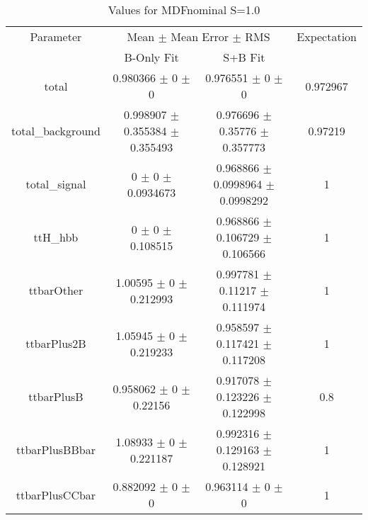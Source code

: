 \begin{table}
\centering
\caption{Values for MDFnominal S=1.0}
\begin{tabular}{cccc}
\toprule
Parameter & \multicolumn{2}{c}{Mean $\pm$ Mean Error $\pm$ RMS} & Expectation\\
 & B-Only Fit & S+B Fit & \\
\midrule
total & \num{0.980366} $\pm$ \num{0} $\pm$ \num{0} & \num{0.976551} $\pm$ \num{0} $\pm$ \num{0} & \num{0.972967}\\
total\_background & \num{0.998907} $\pm$ \num{0.355384} $\pm$ \num{0.355493} & \num{0.976696} $\pm$ \num{0.35776} $\pm$ \num{0.357773} & \num{0.97219}\\
total\_signal & \num{0} $\pm$ \num{0} $\pm$ \num{0.0934673} & \num{0.968866} $\pm$ \num{0.0998964} $\pm$ \num{0.0998292} & \num{1}\\
ttH\_hbb & \num{0} $\pm$ \num{0} $\pm$ \num{0.108515} & \num{0.968866} $\pm$ \num{0.106729} $\pm$ \num{0.106566} & \num{1}\\
ttbarOther & \num{1.00595} $\pm$ \num{0} $\pm$ \num{0.212993} & \num{0.997781} $\pm$ \num{0.11217} $\pm$ \num{0.111974} & \num{1}\\
ttbarPlus2B & \num{1.05945} $\pm$ \num{0} $\pm$ \num{0.219233} & \num{0.958597} $\pm$ \num{0.117421} $\pm$ \num{0.117208} & \num{1}\\
ttbarPlusB & \num{0.958062} $\pm$ \num{0} $\pm$ \num{0.22156} & \num{0.917078} $\pm$ \num{0.123226} $\pm$ \num{0.122998} & \num{0.8}\\
ttbarPlusBBbar & \num{1.08933} $\pm$ \num{0} $\pm$ \num{0.221187} & \num{0.992316} $\pm$ \num{0.129163} $\pm$ \num{0.128921} & \num{1}\\
ttbarPlusCCbar & \num{0.882092} $\pm$ \num{0} $\pm$ \num{0} & \num{0.963114} $\pm$ \num{0} $\pm$ \num{0} & \num{1}\\
\bottomrule
\end{tabular}
\end{table}